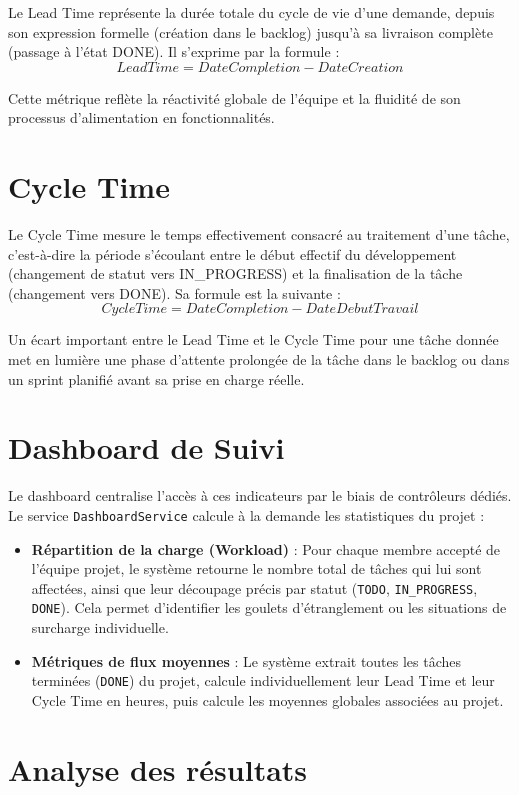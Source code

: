 \documentclass[12pt,a4paper]{report}
\begin{document}
Le Lead Time représente la durée totale du cycle de vie d'une demande, depuis son expression formelle (création dans le backlog) jusqu'à sa livraison complète (passage à l'état DONE).
Il s'exprime par la formule :
$$Lead Time = DateCompletion - DateCreation$$

Cette métrique reflète la réactivité globale de l'équipe et la fluidité de son processus d'alimentation en fonctionnalités.

\section{Cycle Time}

Le Cycle Time mesure le temps effectivement consacré au traitement d'une tâche, c'est-à-dire la période s'écoulant entre le début effectif du développement (changement de statut vers IN\_PROGRESS) et la finalisation de la tâche (changement vers DONE).
Sa formule est la suivante :
$$Cycle Time = DateCompletion - DateDebutTravail$$

Un écart important entre le Lead Time et le Cycle Time pour une tâche donnée met en lumière une phase d'attente prolongée de la tâche dans le backlog ou dans un sprint planifié avant sa prise en charge réelle.

\section{Dashboard de Suivi}

Le dashboard centralise l'accès à ces indicateurs par le biais de contrôleurs dédiés. Le service \verb|DashboardService| calcule à la demande les statistiques du projet :
\begin{itemize}
\item \textbf{Répartition de la charge (Workload)} : Pour chaque membre accepté de l'équipe projet, le système retourne le nombre total de tâches qui lui sont affectées, ainsi que leur découpage précis par statut (\verb|TODO|, \verb|IN_PROGRESS|, \verb|DONE|). Cela permet d'identifier les goulets d'étranglement ou les situations de surcharge individuelle.
\item \textbf{Métriques de flux moyennes} : Le système extrait toutes les tâches terminées (\verb|DONE|) du projet, calcule individuellement leur Lead Time et leur Cycle Time en heures, puis calcule les moyennes globales associées au projet.
\end{itemize}

\section{Analyse des résultats}
\end{document}
